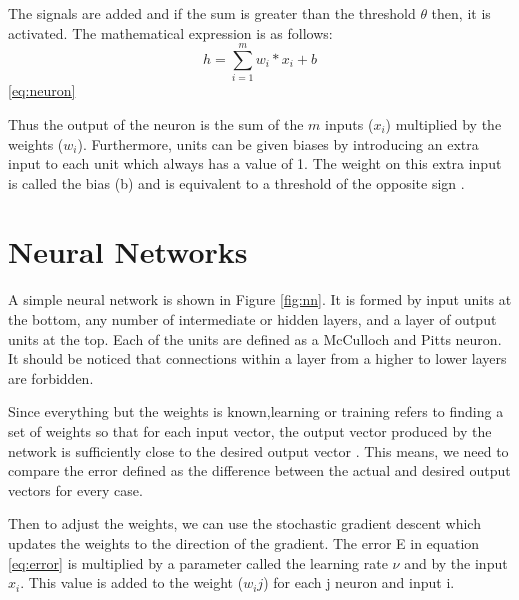 The signals are added and if the sum is greater than the threshold $\theta$ then, it is activated. The mathematical expression is as follows:\\
\begin{equation} \label{eq:neuron}
h=\sum_{i=1}^{m} w_i * x_i + b
\end{equation}\ref{eq:neuron}

Thus the output of the neuron is the sum of the $m$ inputs ($x_i$) multiplied by the weights ($w_i$). Furthermore, units can be given biases by introducing an extra input to each unit which always has a value of 1. The weight on this extra input is called the bias (b) and is equivalent to a threshold of the opposite sign \cite{polk2002cognitive}. 


\section{Neural Networks}

A simple neural network is shown in Figure \ref{fig:nn}. It is formed by input units at the bottom, any number of intermediate or hidden layers, and a layer of output units at the top. Each of the units are  defined as a McCulloch and Pitts neuron. It should be noticed that connections within a layer from a higher to lower layers are forbidden. 

Since everything but the weights is known,learning or training refers to finding a set of weights so that for each input vector, the output vector produced by the network is sufficiently close to the desired output vector \cite{polk2002cognitive}. This means, we need to compare the error defined as the difference between the actual and desired output vectors for every case.

Then to adjust the weights, we can use the stochastic gradient descent which updates the weights to the direction of the gradient. The error E in equation \ref{eq:error} is multiplied by a parameter called the learning rate $\nu$ and by the input $x_i$. This value is added to the weight ($w_ij$) for each j neuron and input i.

